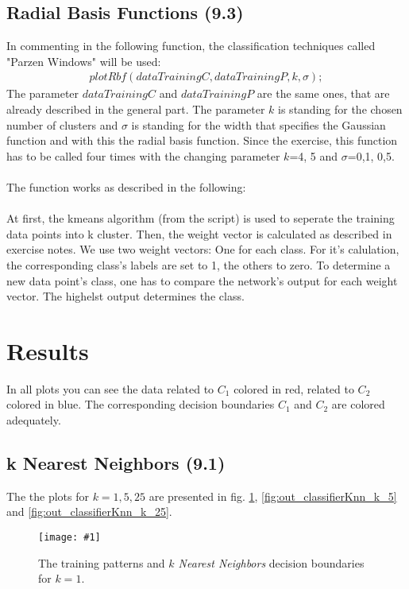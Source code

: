 \documentclass[a4paper,headings=small]{scrartcl}
\newcommand{\image}[3]{
\begin{figure}[htbp]
\centering
\texttt{[image: \#1]}
\caption{#3}
\label{fig:#1}
\end{figure}
}
\begin{document}
\subsection{Radial Basis Functions (9.3)}
In commenting in the following function, the classification techniques called "Parzen Windows" will be used:\\
\begin{align}
plotRbf(dataTrainingC, dataTrainingP, k, \sigma);
\end{align}
The parameter $dataTrainingC$ and $dataTrainingP$ are the same ones, that are already described in the general part. The parameter $k$ is standing for the chosen number of clusters and $\sigma$ is standing for the width that specifies the Gaussian function and with this the radial basis function.
Since the exercise, this function has to be called four times with the changing parameter $k$=4, 5 and $\sigma$=0,1, 0,5.\\
\\
The function works as described in the following:\\
\\
At first, the kmeans algorithm (from the script) is used to seperate the training data points into k cluster. Then, the weight vector is calculated as described in exercise notes. We use two weight vectors: One for each class. For it's calulation, the corresponding class's labels are set to 1, the others to zero. To determine a new data point's class, one has to compare the network's output for each weight vector. The highelst output determines the class.


\section{Results}

\newcommand{\classifierPlotWidth}[0]{0.85}

In all plots you can see the data related to $C_1$ colored in red, related to $C_2$ colored in blue.
The corresponding decision boundaries $C_1$ and $C_2$ are colored adequately.


\subsection{k Nearest Neighbors (9.1)}
The the plots for $k = 1, 5, 25$ are presented in fig.
\ref{fig:out_classifierKnn_k_1},
\ref{fig:out_classifierKnn_k_5} and
\ref{fig:out_classifierKnn_k_25}.

\image{out_classifierKnn_k_1}{\classifierPlotWidth}%
	{The training patterns and \emph{$k$ Nearest Neighbors} decision boundaries for $k = 1$.}
\end{document}

